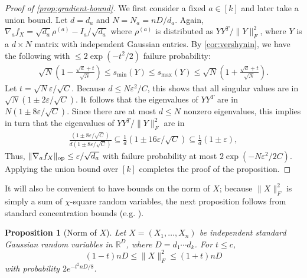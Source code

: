 \documentclass[aos]{imsart}
\newtheorem{prop}[theorem]{Proposition}
\theoremstyle{definition}
\DeclareMathOperator{\op}{op}
\DeclarePairedDelimiter{\norm}{\lVert}{\rVert}
\newcommand{\R}{{\mathbb{R}}}
\newcommand{\eps}{\varepsilon}
\newcommand{\cN}{\mathcal{N}}
\newcommand{\rv}{X}
\begin{document}
\begin{proof}[Proof of \cref{prop:gradient-bound}]
We first consider a fixed $a\in[k]$ and later take a union bound.
Let $d = d_a$ and $N = N_a = n D/d_a$.
Again, $\nabla_a f_{\rv} = \sqrt{d_a} \rho^{(a)} - I_a/\sqrt{d_a}$ where $\rho^{(a)}$ is distributed as $Y Y^T/\|Y\|_F^2$, where $Y$ is a $d \times N$ matrix with independent Gaussian entries.
By \cref{cor:vershynin}, we have the following with $\leq 2 \exp(-t^2/2)$ failure probability:
\begin{align*}
  \sqrt{N} \left( 1 -  \frac{\sqrt{d} + t }{\sqrt{N}}  \right)\leq s_{\min}(Y) \leq s_{\max}(Y) \leq  \sqrt{N} \left( 1 + \frac{\sqrt{d} + t }{\sqrt{N}} \right).
\end{align*}
Let $t = \sqrt{N} \eps / \sqrt{C}$.
Because $d \leq N \eps^2 / C$, this shows that all singular values are in $\sqrt{N} \left( 1 \pm 2\eps/\sqrt{C} \right)$.
It follows that the eigenvalues of $YY^T$ are in $N \left( 1 \pm 8\eps/\sqrt{C} \right)$.
Since there are at most $d \leq N$ nonzero eigenvalues, this implies in turn that the eigenvalues of $Y Y^T/\|Y\|_F^2$ are in
\begin{align*}
\frac {\left( 1 \pm 8\eps/\sqrt{C} \right)} {d \left( 1 \pm 8\eps/\sqrt{C} \right)} \subseteq \frac1d \left( 1 \pm 16\eps/\sqrt{C} \right) \subseteq \frac1d \left( 1 \pm \eps \right),
\end{align*}
Thus,
$\norm{\nabla_a f_{\rv}}_{\op} \leq \eps/\sqrt{d_a}$
with failure probability at most $2 \exp(-N \eps^2/2C)$.
Applying the union bound over $[k]$ completes the proof of the proposition.
\end{proof}

It will also be convenient to have bounds on the norm of $X$; because $\|X\|_F^2$ is simply a sum of $\chi$-square random variables, the next proposition follows from standard concentration bounds (e.g. \cite{W19}).
\begin{prop}[Norm of $X$]\label{prp:xnorm}
Let $\rv = (\rv_1,\dots,\rv_n)$ be independent standard Gaussian random variables in $\R^D$, where $D=d_1\cdots{}d_k$. For $t \leq c$,
$$ (1 - t) nD \leq \|X\|_F^2 \leq (1 + t)nD$$ with probability $2e^{-t^2 nD/8}$.
\end{prop}
\end{document}
